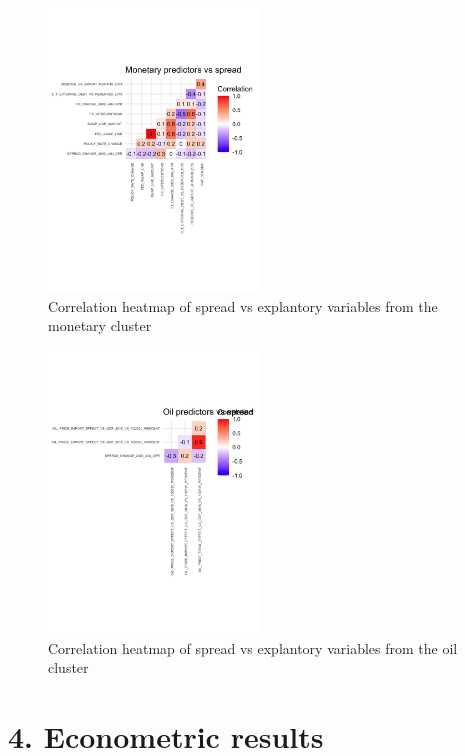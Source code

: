 \documentclass[11pt,]{article}
\begin{document}
\begin{figure}
\centering
\includegraphics[width=0.5\textwidth,height=\textheight]{reportfigures/Corrplot_spread_vs_monetary.png}
\caption{Correlation heatmap of spread vs explantory variables from the
monetary cluster}
\end{figure}

\begin{figure}
\centering
\includegraphics[width=0.5\textwidth,height=\textheight]{reportfigures/Corrplot_spread_vs_oil.png}
\caption{Correlation heatmap of spread vs explantory variables from the
oil cluster}
\end{figure}

\hypertarget{econometric-results}{%
\section{4. Econometric results}\label{econometric-results}}
\end{document}
